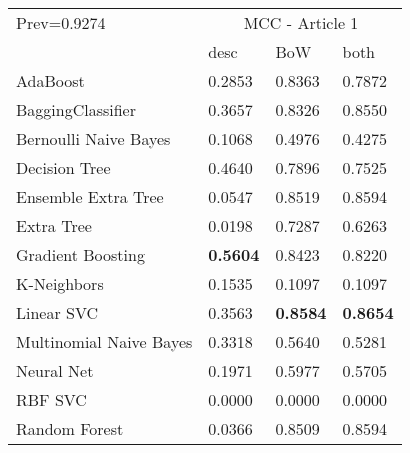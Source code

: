 \begin{tabular}{|l|l|l|l| }
\hline
Prev=0.9274 &  \multicolumn{3}{c|}{MCC - Article 1} \\
\cline{2-4} & desc & BoW & both \\ \hline
AdaBoost                & 0.2853 & 0.8363 & 0.7872\\
BaggingClassifier       & 0.3657 & 0.8326 & 0.8550\\
Bernoulli Naive Bayes   & 0.1068 & 0.4976 & 0.4275\\
Decision Tree           & 0.4640 & 0.7896 & 0.7525\\
Ensemble Extra Tree     & 0.0547 & 0.8519 & 0.8594\\
Extra Tree              & 0.0198 & 0.7287 & 0.6263\\
Gradient Boosting       & {\bf 0.5604} & 0.8423 & 0.8220\\
K-Neighbors             & 0.1535 & 0.1097 & 0.1097\\
Linear SVC              & 0.3563 & {\bf 0.8584} & {\bf 0.8654}\\
Multinomial Naive Bayes & 0.3318 & 0.5640 & 0.5281\\
Neural Net              & 0.1971 & 0.5977 & 0.5705\\
RBF SVC                 & 0.0000 & 0.0000 & 0.0000\\
Random Forest           & 0.0366 & 0.8509 & 0.8594\\
\hline
\end{tabular}